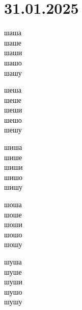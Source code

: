 \documentclass[a5paper,12pt]{article}
\begin{document}
\section{31.01.2025}
\noindent 
\begin{minipage}[t]{0.18\textwidth}
  шаша\\
  шаше\\
  шаши\\
  шашо\\
  шашу
\end{minipage}
\begin{minipage}[t]{0.18\textwidth}
  шеша\\
  шеше\\
  шеши\\
  шешо\\
  шешу
\end{minipage}
\hfill
\begin{minipage}[t]{0.18\textwidth}
  шиша\\
  шише\\
  шиши\\
  шишо\\
  шишу
\end{minipage}
\hfill
\begin{minipage}[t]{0.18\textwidth}
  шоша\\
  шоше\\
  шоши\\
  шошо\\
  шошу
\end{minipage}
\hfill 
\begin{minipage}[t]{0.18\textwidth}
  шуша\\
  шуше\\
  шуши\\
  шушо\\
  шушу
\end{minipage}

\vspace{1cm}
\end{document}
